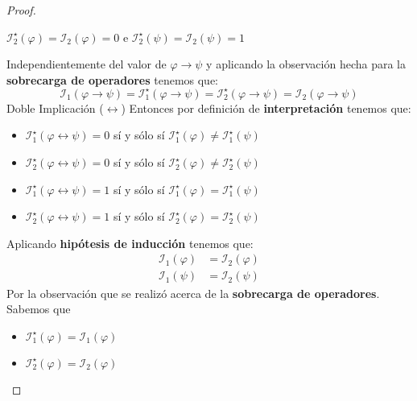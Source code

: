 \documentclass[a4paper]{article}
\begin{document}
\begin{proof}
\begin{itemize}
        \newline
        \(\mathcal{I}^{\star}_{2}\left( \varphi\right) = \mathcal{I}_{2}\left( \varphi\right) = 0\) e \(\mathcal{I}^{\star}_{2}\left( \psi\right) = \mathcal{I}_{2}\left( \psi\right) = 1\)
    \end{itemize}
    Independientemente del valor de \(\varphi \to \psi\) y aplicando la observación hecha para la \textbf{sobrecarga de operadores} tenemos que:
    \[
        \mathcal{I}_{1}\left(\varphi \to \psi\right) = \mathcal{I}^{\star}_{1}\left(\varphi \to \psi\right) = \mathcal{I}^{\star}_{2}\left(\varphi \to \psi\right) = \mathcal{I}_{2}\left(\varphi \to \psi\right)
    \]
    Doble Implicación (\(\leftrightarrow\))
    \newline
    Entonces por definición de \textbf{interpretación} tenemos que:
    \begin{itemize}
        \item \(\mathcal{I}^{\star}_{1}\left(\varphi \leftrightarrow \psi\right) = 0\) sí y sólo sí \(\mathcal{I}^{\star}_{1}\left( \varphi\right) \neq \mathcal{I}^{\star}_{1}\left( \psi\right)\)
        \item \(\mathcal{I}^{\star}_{2}\left(\varphi \leftrightarrow \psi\right) = 0\) sí y sólo sí \(\mathcal{I}^{\star}_{2}\left( \varphi\right) \neq \mathcal{I}^{\star}_{2}\left( \psi\right)\)
        \item \(\mathcal{I}^{\star}_{1}\left(\varphi \leftrightarrow \psi\right) = 1\) sí y sólo sí \(\mathcal{I}^{\star}_{1}\left( \varphi\right) = \mathcal{I}^{\star}_{1}\left( \psi\right)\)
        \item \(\mathcal{I}^{\star}_{2}\left(\varphi \leftrightarrow \psi\right) = 1\) sí y sólo sí \(\mathcal{I}^{\star}_{2}\left( \varphi\right) = \mathcal{I}^{\star}_{2}\left( \psi\right)\)
    \end{itemize}
    Aplicando \textbf{hipótesis de inducción} tenemos que:
    \begin{align*}
        \mathcal{I}_1(\varphi) &= \mathcal{I}_2(\varphi) \\
        \mathcal{I}_1(\psi) &= \mathcal{I}_2(\psi)
    \end{align*}
    Por la observación que se realizó acerca de la \textbf{sobrecarga de operadores}. Sabemos que 
    \begin{itemize}
        \item \(\mathcal{I}^{\star}_{1}\left(\varphi\right) = \mathcal{I}_{1}\left(\varphi\right)\)
        \item \(\mathcal{I}^{\star}_{2}\left(\varphi\right) = \mathcal{I}_{2}\left(\varphi\right)\)

\end{itemize}
\end{proof}
\end{document}
